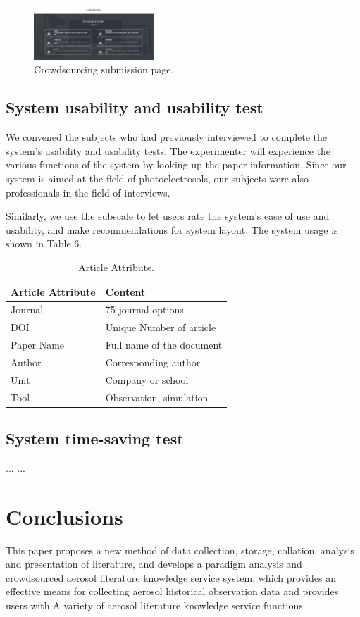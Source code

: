 \begin{figure}
	\includegraphics[width=0.4\textwidth]{figures/pic9.pdf}
	\caption{Crowdsourcing submission page.}
\end{figure}

\subsection{System usability and usability test}
We convened the subjects who had previously interviewed to complete the system's usability and usability tests. The experimenter will experience the various functions of the system by looking up the paper information. Since our system is aimed at the field of photoelectrosols, our subjects were also professionals in the field of interviews.

Similarly, we use the subscale to let users rate the system's ease of use and usability, and make recommendations for system layout. The system usage is shown in Table 6.

\begin{table}
	\caption{Article Attribute.}
	\label{tab:freq}
	\begin{tabular}{ll}
		\toprule
		Article Attribute&Content\\
		\midrule
		Journal & 75 journal options\\
		DOI & Unique Number of article\\
		Paper Name & Full name of the document\\
		Author & Corresponding author\\
		Unit & Company or school\\
		Tool & Observation, simulation\\
		\bottomrule
	\end{tabular}
\end{table}

\subsection{System time-saving test}
... ...


\section{Conclusions}
This paper proposes a new method of data collection, storage, collation, analysis and presentation of literature, and develops a paradigm analysis and crowdsourced aerosol literature knowledge service system, which provides an effective means for collecting aerosol historical observation data and provides users with A variety of aerosol literature knowledge service functions.

